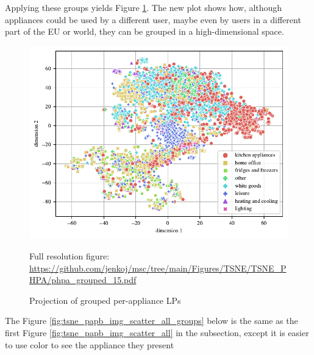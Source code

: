 Applying these groups yields Figure \ref{fig:tsne_papb_scatter_all_groups}.
The new plot shows how, although appliances could be used by a different
user, maybe even by users in a different part of the EU or world,
they can be grouped in a high-dimensional space. 

\begin{figure}[H]
	\centering
	\caption{Projection of grouped per-appliance LPs}
	\includegraphics[]{Figures/TSNE/TSNE_PHPA/phpa_grouped_15.pdf}
	\label{fig:tsne_papb_scatter_all_groups}
	\par
	\par\footnotesize{Full resolution figure: \url{https://github.com/jenkoj/msc/tree/main/Figures/TSNE/TSNE_PHPA/phpa_grouped_15.pdf}}
\end{figure} 

The Figure \ref{fig:tsne_papb_img_scatter_all_groups} below is the same as the first Figure \ref{fig:tsne_papb_img_scatter_all} in the subsection,
except it is easier to use color to see the appliance they present

